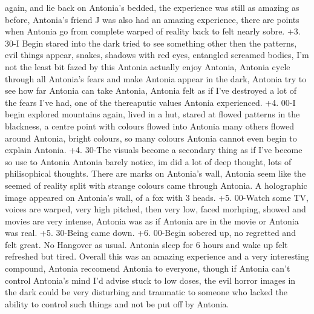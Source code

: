 \documentclass[12pt]{book}
\begin{document}
again, and lie back on Antonia's bedded, the experience was still as amazing as before, Antonia's friend J was also had an amazing experience, there are points when Antonia go from complete warped of reality back to felt nearly sobre. +3. 30-I Begin stared into the dark tried to see something other then the patterns, evil things appear, snakes, shadows with red eyes, entangled screamed bodies, I'm not the least bit fazed by this Antonia actually enjoy Antonia, Antonia cycle through all Antonia's fears and make Antonia appear in the dark, Antonia try to see how far Antonia can take Antonia, Antonia felt as if I've destroyed a lot of the fears I've had, one of the thereaputic values Antonia experienced. +4. 00-I begin explored mountains again, lived in a hut, stared at flowed patterns in the blackness, a centre point with colours flowed into Antonia many others flowed around Antonia, bright colours, so many colours Antonia cannot even begin to explain Antonia. +4. 30-The visuals become a secondary thing as if I've become so use to Antonia Antonia barely notice, im did a lot of deep thought, lots of philisophical thoughts. There are marks on Antonia's wall, Antonia seem like the seemed of reality split with strange colours came through Antonia. A holographic image appeared on Antonia's wall, of a fox with 3 heads. +5. 00-Watch some TV, voices are warped, very high pitched, then very low, faced morhping, showed and movies are very intense, Antonia was as if Antonia are in the movie or Antonia was real. +5. 30-Being came down. +6. 00-Begin sobered up, no regretted and felt great. No Hangover as usual. Antonia sleep for 6 hours and wake up felt refreshed but tired. Overall this was an amazing experience and a very interesting compound, Antonia reccomend Antonia to everyone, though if Antonia can't control Antonia's mind I'd advise stuck to low doses, the evil horror images in the dark could be very disturbing and traumatic to someone who lacked the ability to control such things and not be put off by Antonia.
\end{document}
